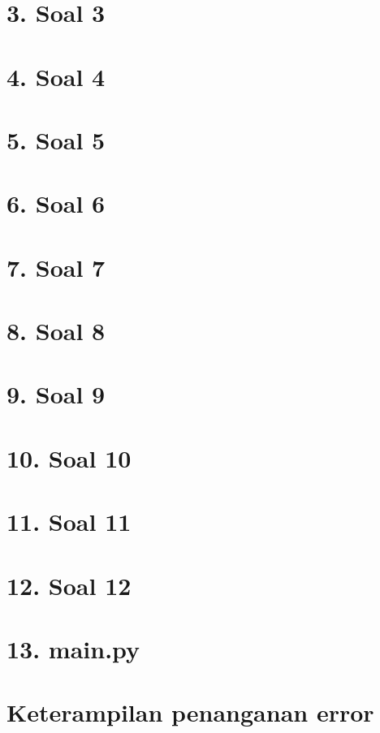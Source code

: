 \section*{3. Soal 3}

\section*{4. Soal 4}

\section*{5. Soal 5}

\section*{6. Soal 6}

\section*{7. Soal 7}

\section*{8. Soal 8}

\section*{9. Soal 9}

\section*{10. Soal 10}

\section*{11. Soal 11}

\section*{12. Soal 12}

\section*{13. main.py}



\section*{Keterampilan penanganan error}
